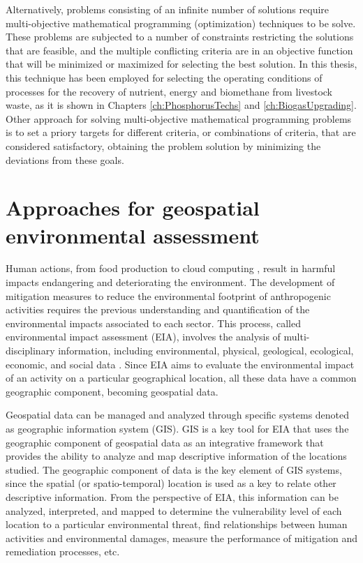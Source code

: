 \begin{refsection}[referencesCh1]
Alternatively, problems consisting of an infinite number of solutions require multi-objective mathematical programming (optimization) techniques to be solve. These problems are subjected to a number of constraints restricting the solutions that are feasible, and the multiple conflicting criteria are in an objective function that will be minimized or maximized for selecting the best solution. In this thesis, this technique has been employed for selecting the operating conditions of processes for the recovery of nutrient, energy and biomethane from livestock waste, as it is shown in Chapters \ref{ch:PhosphorusTechs} and \ref{ch:BiogasUpgrading}. Other approach for solving multi-objective mathematical programming problems is to set a priory targets for different criteria, or combinations of criteria, that are considered satisfactory, obtaining the problem solution by minimizing the deviations from these goals.

\section{Approaches for geospatial environmental assessment}
Human actions, from food production\citep{foster2007environmental} to cloud computing \citep{di2017can}, result in harmful impacts endangering and deteriorating the environment. The development of mitigation measures to reduce the environmental footprint of anthropogenic activities requires the previous understanding and quantification of the environmental impacts associated to each sector. This process, called environmental impact assessment (EIA), involves the analysis of multi-disciplinary information, including environmental, physical, geological, ecological, economic, and social data \citep{gharehbaghi2018gis}. Since EIA aims to evaluate the environmental impact of an activity on a particular geographical location, all these data have a common geographic component, becoming geospatial data.

Geospatial data can be managed and analyzed through specific systems denoted as geographic information system (GIS). GIS is a key tool for EIA that uses the geographic component of geospatial data as an integrative framework that provides the ability to analyze and map descriptive information of the locations studied. The geographic component of data is the key element of GIS systems, since the spatial (or spatio-temporal) location is used as a key to relate other descriptive information. From the perspective of EIA, this information can be analyzed, interpreted, and mapped to determine the vulnerability level of each location to a particular environmental threat, find relationships between human activities and environmental damages, measure the performance of mitigation and remediation processes, etc. {\color{red}{figure?}}


\end{refsection}

